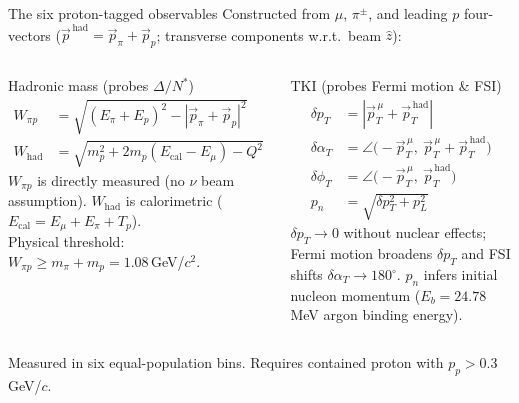 \documentclass[aspectratio=169,10pt]{beamer}
\begin{document}
\begin{frame}{The six proton-tagged observables}
  \footnotesize
  Constructed from $\mu$, $\pi^\pm$, and leading $p$ four-vectors ($\vec p^{\,\mathrm{had}}=\vec p_\pi+\vec p_p$; transverse components w.r.t.\ beam $\hat z$):
  \vspace{-1mm}
  \begin{columns}[T]
  \begin{block}{Hadronic mass (probes $\Delta / N^\ast$)}\scriptsize
  \begin{align*}
  W_{\pi p} &= \sqrt{(E_\pi+E_p)^2-|\vec p_\pi+\vec p_p|^2}\\
  W_\mathrm{had} &= \sqrt{m_p^2+2m_p(E_\mathrm{cal}-E_\mu)-Q^2}
  \end{align*}
  $W_{\pi p}$ is \alert{directly measured} (no $\nu$ beam assumption). $W_\mathrm{had}$ is calorimetric ($E_\mathrm{cal}=E_\mu+E_\pi+T_p$).\\
  Physical threshold: $W_{\pi p}\ge m_\pi+m_p=1.08$\,GeV/$c^2$.
  \end{block}
  \begin{block}{TKI (probes Fermi motion \& FSI)}\scriptsize
  \begin{align*}
  \delta p_T &= |\vec p_T^{\,\mu}+\vec p_T^{\,\mathrm{had}}|\\
  \delta\alpha_T &= \angle\big(-\vec p_T^{\,\mu},\ \vec p_T^{\,\mu}+\vec p_T^{\,\mathrm{had}}\big)\\
  \delta\phi_T &= \angle\big(-\vec p_T^{\,\mu},\ \vec p_T^{\,\mathrm{had}}\big)\\
  p_n &= \sqrt{\delta p_T^2+p_L^2}
  \end{align*}
  $\delta p_T \to 0$ without nuclear effects; \alert{Fermi motion broadens} $\delta p_T$ and \alert{FSI shifts $\delta\alpha_T \to 180^\circ$}. $p_n$ infers initial nucleon momentum ($E_b=24.78$\,MeV argon binding energy).
  \end{block}
  \end{columns}
  \vspace{1mm}
  {\scriptsize Measured in six equal-population bins. Requires contained proton with $p_p > 0.3$\,GeV/$c$.}
\end{frame}
\end{document}
